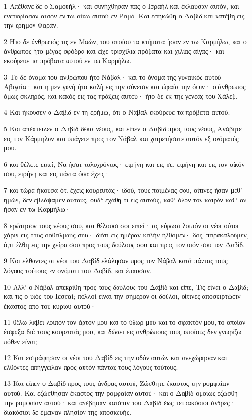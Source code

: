 \par 1 Απέθανε δε ο Σαμουήλ· και συνήχθησαν πας ο Ισραήλ και έκλαυσαν αυτόν, και ενεταφίασαν αυτόν εν τω οίκω αυτού εν Ραμά. Και εσηκώθη ο Δαβίδ και κατέβη εις την έρημον Φαράν.
\par 2 Ήτο δε άνθρωπός τις εν Μαών, του οποίου τα κτήματα ήσαν εν τω Καρμήλω, και ο άνθρωπος ήτο μέγας σφόδρα και είχε τρισχίλια πρόβατα και χιλίας αίγας· και εκούρευε τα πρόβατα αυτού εν τω Καρμήλω.
\par 3 Το δε όνομα του ανθρώπου ήτο Νάβαλ· και το όνομα της γυναικός αυτού Αβιγαία· και η μεν γυνή ήτο καλή εις την σύνεσιν και ώραία την όψιν· ο άνθρωπος όμως σκληρός, και κακός εις τας πράξεις αυτού· ήτο δε εκ της γενεάς του Χάλεβ.
\par 4 Και ήκουσεν ο Δαβίδ εν τη ερήμω, ότι ο Νάβαλ εκούρευε τα πρόβατα αυτού.
\par 5 Και απέστειλεν ο Δαβίδ δέκα νέους, και είπεν ο Δαβίδ προς τους νέους, Ανάβητε εις τον Κάρμηλον και υπάγετε προς τον Νάβαλ και χαιρετήσατε αυτόν εξ ονόματός μου.
\par 6 και θέλετε ειπεί, Να ήσαι πολυχρόνιος· ειρήνη και εις σε, ειρήνη και εις τον οίκόν σου, ειρήνη και εις πάντα όσα έχεις·
\par 7 και τώρα ήκουσα ότι έχεις κουρευτάς· ιδού, τους ποιμένας σου, οίτινες ήσαν μεθ' ημών, δεν εβλάψαμεν αυτούς, ουδέ εχάθη τι εις αυτούς, καθ' όλον τον καιρόν καθ' ον ήσαν εν τω Καρμήλω·
\par 8 ερώτησον τους νέους σου, και θέλουσι σοι ειπεί· ας εύρωσι λοιπόν οι νέοι ούτοι χάριν εις τους οφθαλμούς σου· διότι εις ημέραν καλήν ήλθομεν· δος, παρακαλούμεν, ό,τι έλθη εις την χείρα σου προς τους δούλους σου και προς τον υιόν σου τον Δαβίδ.
\par 9 Και ελθόντες οι νέοι του Δαβίδ ελάλησαν προς τον Νάβαλ κατά πάντας τους λόγους τούτους εν ονόματι του Δαβίδ, και έπαυσαν.
\par 10 Αλλ' ο Νάβαλ απεκρίθη προς τους δούλους του Δαβίδ και είπε, Τις είναι ο Δαβίδ; και τις ο υιός του Ιεσσαί; πολλοί είναι την σήμερον οι δούλοι, οίτινες αποσκιρτώσιν έκαστος από του κυρίου αυτού·
\par 11 θέλω λάβει λοιπόν τον άρτον μου και το ύδωρ μου και το σφακτόν μου, το οποίον έσφαξα διά τους κουρευτάς μου, και δώσει εις ανθρώπους τους οποίους δεν γνωρίζω πόθεν είναι;
\par 12 Και εστράφησαν οι νέοι του Δαβίδ εις την οδόν αυτών και ανεχώρησαν και ελθόντες απήγγειλαν προς αυτόν πάντας τους λόγους τούτους.
\par 13 Και είπεν ο Δαβίδ προς τους άνδρας αυτού, Ζώσθητε έκαστος την ρομφαίαν αυτού. Και εζώσθησαν έκαστος την ρομφαίαν αυτού· και ο Δαβίδ ομοίως εζώσθη την ρομφαίαν αυτού· και ανέβησαν κατόπιν του Δαβίδ έως τετρακόσιοι άνδρες· διακόσιοι δε έμειναν πλησίον της αποσκευής.

